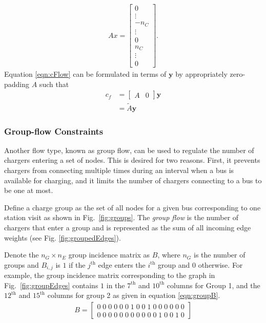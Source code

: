 \begin{align}\label{eqn:cFlow}
	Ax = \begin{bmatrix} 0 \\ \vdots \\ -n_C \\ \vdots \\ 0 \\ n_C \\ \vdots \\ 0\end{bmatrix}.
\end{align}
Equation \ref{eqn:cFlow} can be formulated in terms of $\mathbf{y}$ by appropriately zero-padding $A$ such that
\begin{equation}\label{eqn:cFlow2}
	\begin{aligned}
		c_f &= \begin{bmatrix}A & 0 \end{bmatrix}\mathbf{y}\\
		    &= \tilde{A} \mathbf{y} 
	\end{aligned}
\end{equation}
\subsubsection{Group-flow Constraints}
\par Another flow type, known as group flow, can be used to regulate the number of chargers entering a set of nodes. This is desired for two reasons.  First, it prevents chargers from connecting multiple times during an interval when a bus is available for charging, and it limits the number of chargers connecting to a bus to be one at most.
\par Define a charge group as the set of all nodes for a given bus corresponding to one station visit as shown in Fig.~\ref{fig:groups}. The \textit{group flow} is the number of chargers that enter a group and is represented as the sum of all incoming edge weights (see Fig. \ref{fig:groupedEdges}). 
\par Denote the $n_G \times n_E$ group incidence matrix as $B$, where $n_G$ is the number of groups and $B_{i,j}$ is $1$ if the $j^{\text{th}}$ edge enters the $i^{\text{th}}$ group and $0$ otherwise. For example, the group incidence matrix corresponding to the graph in Fig.~\ref{fig:groupEdges} contains $1$ in the $7^{\text{th}}$ and $10^{\text{th}}$ columns for Group 1, and the $12^{\text{th}}$ and $15^{\text{th}}$ columns for group 2 as given in equation \ref{eqn:groupB}.
\begin{align}\label{eqn:groupB}
	B = \begin{bmatrix}0 \; 0 \; 0 \; 0 \; 0 \; 0 \; 1 \; 0 \; 0 \; 1 \; 0 \; 0 \; 0 \; 0 \; 0 \; 0\\
	                   0 \; 0 \; 0 \; 0 \; 0 \; 0 \; 0 \; 0 \; 0 \; 0 \; 0 \; 1 \; 0 \; 0 \; 1 \; 0\end{bmatrix}
\end{align}

